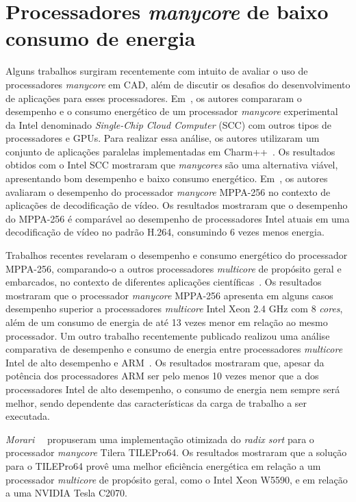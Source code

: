 
\section{Processadores \textit{manycore} de baixo consumo de energia}
Alguns trabalhos surgiram recentemente com intuito de avaliar o uso de
processadores \emph{manycore} em CAD, além de discutir os desafios do
desenvolvimento de aplicações para esses processadores.
Em~\cite{SCCEnergy:2012}, os autores compararam o desempenho e o consumo
energético de um processador \emph{manycore} experimental da Intel denominado
\emph{Single-Chip Cloud Computer} (SCC) com outros tipos de processadores e
GPUs. Para realizar essa análise, os autores utilizaram um conjunto de
aplicações paralelas implementadas em Charm++~\cite{Charm:2012}. Os resultados
obtidos com o Intel SCC mostraram que \emph{manycores} são uma alternativa
viável, apresentando bom desempenho e baixo consumo energético.
Em~\cite{MPPA-1:2013}, os autores avaliaram o desempenho do processador
\emph{manycore} MPPA-256 no contexto de aplicações de decodificação de vídeo. Os
resultados mostraram que o desempenho do MPPA-256 é comparável ao desempenho de
processadores Intel atuais em uma decodificação de vídeo no padrão H.264,
consumindo 6 vezes menos energia.

Trabalhos recentes revelaram o desempenho e consumo energético do processador
MPPA-256, comparando-o a outros processadores \textit{multicore} de propósito
geral e embarcados, no contexto de diferentes aplicações
científicas~\cite{Castro-SBAC-PAD:2014,Castro-IA3:2013,Castro-IA3-JPDC:2014}. Os
resultados mostraram que o processador \emph{manycore} MPPA-256 apresenta em
alguns casos desempenho superior a processadores \emph{multicore} Intel Xeon 2.4
GHz com 8 \emph{cores}, além de um consumo de energia de até 13 vezes menor em
relação ao mesmo processador. Um outro trabalho recentemente publicado realizou
uma análise comparativa de desempenho e consumo de energia entre processadores
\emph{multicore} Intel de alto desempenho e ARM~\cite{Castro-Padoin-IET:2015}.
Os resultados mostraram que, apesar da potência dos processadores ARM ser pelo
menos 10 vezes menor que a dos processadores Intel de alto desempenho, o consumo
de energia nem sempre será melhor, sendo dependente das características da carga
de trabalho a ser executada.

\emph{Morari}~\etal~\cite{Valero:2012} propuseram uma implementação otimizada do
\textit{radix sort} para o processador \textit{manycore} Tilera TILEPro64. Os
resultados mostraram que a solução para o TILEPro64 provê uma melhor eficiência
energética em relação a um processador \textit{multicore} de propósito geral, como
o Intel Xeon W5590, e em relação a uma \gpu NVIDIA Tesla C2070.

